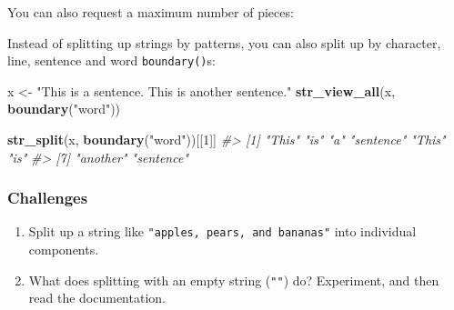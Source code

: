 \documentclass[]{book}
\newenvironment{Shaded}{\begin{snugshade}}{\end{snugshade}}
\newcommand{\CommentTok}[1]{\textcolor[rgb]{0.56,0.35,0.01}{\textit{#1}}}
\newcommand{\DataTypeTok}[1]{\textcolor[rgb]{0.13,0.29,0.53}{#1}}
\newcommand{\DecValTok}[1]{\textcolor[rgb]{0.00,0.00,0.81}{#1}}
\newcommand{\KeywordTok}[1]{\textcolor[rgb]{0.13,0.29,0.53}{\textbf{#1}}}
\newcommand{\NormalTok}[1]{#1}
\newcommand{\OperatorTok}[1]{\textcolor[rgb]{0.81,0.36,0.00}{\textbf{#1}}}
\newcommand{\OtherTok}[1]{\textcolor[rgb]{0.56,0.35,0.01}{#1}}
\newcommand{\StringTok}[1]{\textcolor[rgb]{0.31,0.60,0.02}{#1}}
\begin{document}
You can also request a maximum number of pieces:

\begin{Shaded}
\end{Shaded}

Instead of splitting up strings by patterns, you can also split up by character, line, sentence and word \texttt{boundary()}s:

\begin{Shaded}
\begin{Highlighting}[]
\NormalTok{x <-}\StringTok{ "This is a sentence.  This is another sentence."}
\KeywordTok{str_view_all}\NormalTok{(x, }\KeywordTok{boundary}\NormalTok{(}\StringTok{"word"}\NormalTok{))}
\end{Highlighting}
\end{Shaded}

\hypertarget{htmlwidget-21c7483268bafca56cec}{}

\begin{Shaded}
\begin{Highlighting}[]
\KeywordTok{str_split}\NormalTok{(x, }\KeywordTok{boundary}\NormalTok{(}\StringTok{"word"}\NormalTok{))[[}\DecValTok{1}\NormalTok{]]}
\CommentTok{#> [1] "This"     "is"       "a"        "sentence" "This"     "is"      }
\CommentTok{#> [7] "another"  "sentence"}
\end{Highlighting}
\end{Shaded}

\hypertarget{challenges-19}{%
\subsubsection*{Challenges}\label{challenges-19}}

\begin{enumerate}
\def\labelenumi{\arabic{enumi}.}
\item
  Split up a string like \texttt{"apples,\ pears,\ and\ bananas"} into individual
  components.
\item
  What does splitting with an empty string (\texttt{""}) do? Experiment, and
  then read the documentation.
\end{enumerate}
\end{document}
